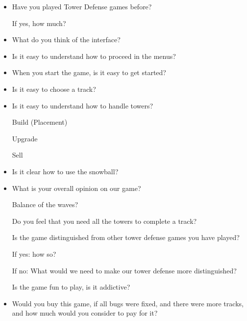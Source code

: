 \begin{itemize}

\item Have you played Tower Defense games before?

\subitem If yes, how much?

\item What do you think of the interface?
 
\item Is it easy to understand how to proceed in the menus?
 
\item When you start the game, is it easy to get started?
 
\item Is it easy to choose a track?
 
\item Is it easy to understand how to handle towers?
 
\subitem Build (Placement)
 
\subitem Upgrade

\subitem Sell
 
\item Is it clear how to use the snowball?
 
\item What is your overall opinion on our game?
 
\subitem Balance of the waves?
 
\subitem Do you feel that you need all the towers to complete a track?
 
\subitem Is the game distinguished from other tower defense games you have played?
 
\subsubitem If yes: how so?
 
\subsubitem If no: What would we need to make our tower defense more distinguished?
 
\subitem Is the game fun to play, is it addictive?
 
\item Would you buy this game, if all bugs were fixed, and there were more tracks, and how much would you consider to pay for it?
\end{itemize}